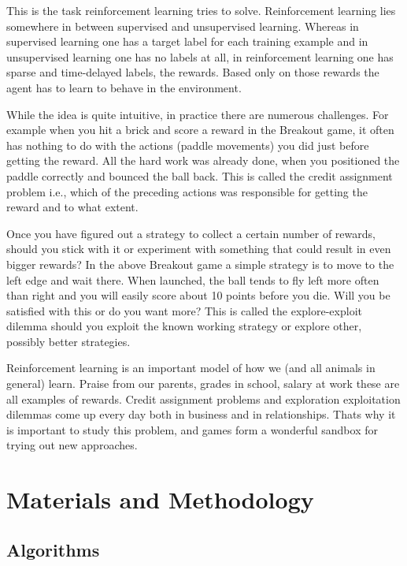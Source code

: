\documentclass[a4paper,11pt]{report}
\begin{document}
			This is the task reinforcement learning tries to solve. Reinforcement learning lies somewhere in between supervised and unsupervised learning. Whereas in supervised learning one has a target label for each training example and in unsupervised learning one has no labels at all, in reinforcement learning one has sparse and time-delayed labels, the rewards. Based only on those rewards the agent has to learn to behave in the environment.

			While the idea is quite intuitive, in practice there are numerous challenges. For example when you hit a brick and score a reward in the Breakout game, it often has nothing to do with the actions (paddle movements) you did just before getting the reward. All the hard work was already done, when you positioned the paddle correctly and bounced the ball back. This is called the credit assignment problem i.e., which of the preceding actions was responsible for getting the reward and to what extent.

			Once you have figured out a strategy to collect a certain number of rewards, should you stick with it or experiment with something that could result in even bigger rewards? In the above Breakout game a simple strategy is to move to the left edge and wait there. When launched, the ball tends to fly left more often than right and you will easily score about 10 points before you die. Will you be satisfied with this or do you want more? This is called the explore-exploit dilemma should you exploit the known working strategy or explore other, possibly better strategies.

			Reinforcement learning is an important model of how we (and all animals in general) learn. Praise from our parents, grades in school, salary at work these are all examples of rewards. Credit assignment problems and exploration exploitation dilemmas come up every day both in business and in relationships. Thats why it is important to study this problem, and games form a wonderful sandbox for trying out new approaches.

	\chapter{Materials and Methodology}
		\section{Algorithms}
\end{document}
